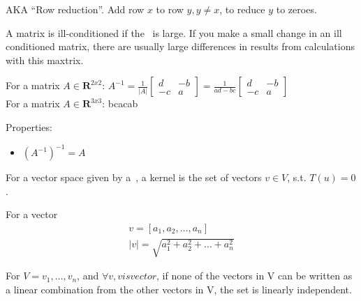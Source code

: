 \begin{definition}
    AKA ``Row reduction''. Add row $x$ to row $y, y \neq x$, to reduce $y$ to 
    zeroes.

\end{definition}

\begin{definition}
    A matrix is ill-conditioned if the~ is large.
    If you make a small change in an ill conditioned matrix, there are usually
    large differences in results from calculations with this maxtrix.

\end{definition}

\begin{definition}[Inverse]
    For a matrix $A \in \mathbf{R}^{2x2}$:
    $A^{-1} = \frac{1}{|A|}
        \begin{bmatrix}
            d & -b \\
            -c & a
        \end{bmatrix}
    = \frac{1}{ad - bc}
        \begin{bmatrix}
            d & -b \\
            -c & a
        \end{bmatrix}
    $\\
    For a matrix $A \in \mathbf{R}^{3x3}$: bcacab

    Properties:
    \begin{itemize}
        \item $(A^{-1})^{-1} = A$
    \end{itemize}
\end{definition}

\begin{definition}[Kernel]
    For a vector space given by a~, a kernel is the set
    of vectors $v \in V$, s.t. $T(u) = 0$.
\end{definition}

\begin{definition}\label{vectorlength}
    For a vector 
    \begin{align*}
        v = [a_{1}, a_{2}, \dots , a_{n}] \\
        |v| = \sqrt{a^{2}_{1} + a^{2}_{2} + \dots + a^{2}_{n}}{}
    \end{align*}
\end{definition}

\begin{definition}
    For $V = {v_{1}, \dots, v_{n}}$, and $\forall v, v is vector$,
    if none of the vectors in V can be written as a linear combination
    from the other vectors in V, the set is linearly independent.
\end{definition}

